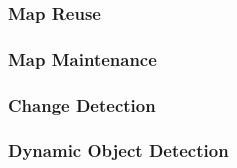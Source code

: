 \subsubsection{Map Reuse}
\subsubsection{Map Maintenance}
\subsubsection{Change Detection}
\subsubsection{Dynamic Object Detection}
